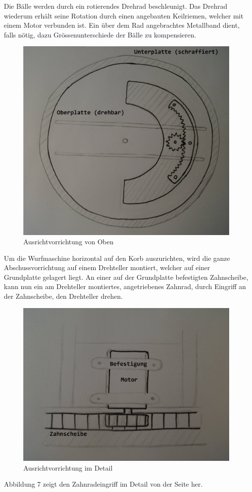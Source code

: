 Die Bälle werden durch ein rotierendes Drehrad beschleunigt. Das Drehrad wiederum erhält seine Rotation durch einen angebauten Keilriemen, welcher mit einem Motor verbunden ist. Ein über dem Rad angebrachtes Metallband dient, falls nötig, dazu Grössenunterschiede der Bälle zu kompensieren.
\begin{figure}[h!]
	\centering
	\includegraphics[scale=0.35]{../../fig/Ausrichtvorrichtung_Oben.jpg}
	\caption{Ausrichtvorrichtung von Oben}
\end{figure}
Um die Wurfmaschine horizontal auf den Korb auszurichten, wird die ganze Abschussvorrichtung auf einem Drehteller montiert, welcher auf einer Grundplatte gelagert liegt. An einer auf der Grundplatte befestigten Zahnscheibe, kann nun ein am Drehteller montiertes, angetriebenes Zahnrad, durch Eingriff an der Zahnscheibe, den Drehteller drehen.
\begin{figure}[h!]
	\centering
	\includegraphics[scale=0.35]{../../fig/Ausrichtvorrichtung_Detail.jpg}
	\caption{Ausrichtvorrichtung im Detail}
\end{figure}
Abbildung 7 zeigt den Zahnradeingriff im Detail von der Seite her.
